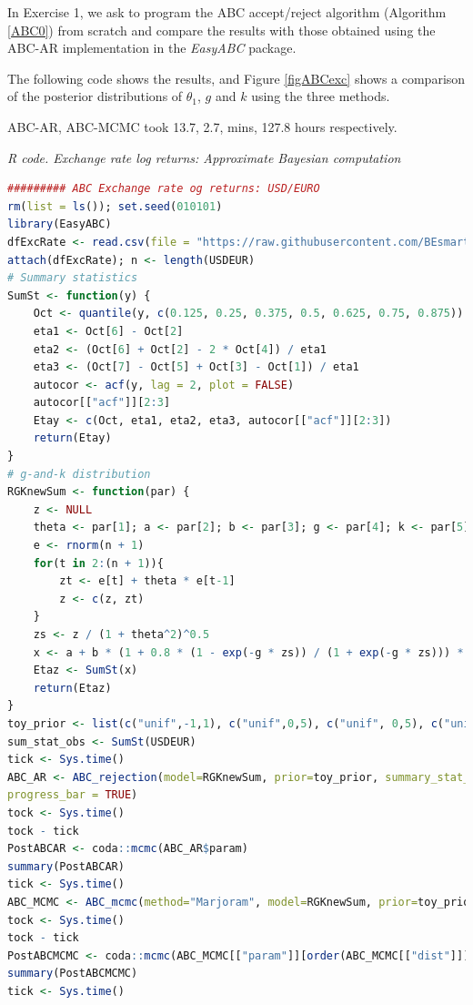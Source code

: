 In Exercise 1, we ask to program the ABC accept/reject algorithm (Algorithm \ref{ABC0}) from scratch and compare the results with those obtained using the ABC-AR implementation in the \textit{EasyABC} package.

The following code shows the results, and Figure \ref{figABCexc} shows a comparison of the posterior distributions of $\theta_1$, $g$ and $k$ using the three methods.

ABC-AR, ABC-MCMC took 13.7, 2.7,  mins, 127.8 hours respectively.

\begin{tcolorbox}[enhanced,width=4.67in,center upper,
	fontupper=\large\bfseries,drop shadow southwest,sharp corners]
	\textit{R code. Exchange rate log returns: Approximate Bayesian computation}
	\begin{VF}
		\begin{lstlisting}[language=R]
######### ABC Exchange rate og returns: USD/EURO
rm(list = ls()); set.seed(010101)
library(EasyABC)
dfExcRate <- read.csv(file = "https://raw.githubusercontent.com/BEsmarter-consultancy/BSTApp/refs/heads/master/DataApp/ExchangeRate.csv", sep = ",", header = T)
attach(dfExcRate); n <- length(USDEUR)
# Summary statistics
SumSt <- function(y) {
	Oct <- quantile(y, c(0.125, 0.25, 0.375, 0.5, 0.625, 0.75, 0.875))
	eta1 <- Oct[6] - Oct[2]
	eta2 <- (Oct[6] + Oct[2] - 2 * Oct[4]) / eta1
	eta3 <- (Oct[7] - Oct[5] + Oct[3] - Oct[1]) / eta1
	autocor <- acf(y, lag = 2, plot = FALSE)
	autocor[["acf"]][2:3]
	Etay <- c(Oct, eta1, eta2, eta3, autocor[["acf"]][2:3])
	return(Etay)
}
# g-and-k distribution
RGKnewSum <- function(par) {
	z <- NULL
	theta <- par[1]; a <- par[2]; b <- par[3]; g <- par[4]; k <- par[5]
	e <- rnorm(n + 1)
	for(t in 2:(n + 1)){
		zt <- e[t] + theta * e[t-1]
		z <- c(z, zt)
	}
	zs <- z / (1 + theta^2)^0.5
	x <- a + b * (1 + 0.8 * (1 - exp(-g * zs)) / (1 + exp(-g * zs))) * (1 + zs^2)^k * zs
	Etaz <- SumSt(x)
	return(Etaz)
}
toy_prior <- list(c("unif",-1,1), c("unif",0,5), c("unif", 0,5), c("unif", -5,5), c("unif", -0.5,5))
sum_stat_obs <- SumSt(USDEUR)
tick <- Sys.time()
ABC_AR <- ABC_rejection(model=RGKnewSum, prior=toy_prior, summary_stat_target = sum_stat_obs, nb_simul=100000, tol = 0.01,
progress_bar = TRUE)
tock <- Sys.time()
tock - tick
PostABCAR <- coda::mcmc(ABC_AR$param)
summary(PostABCAR)
tick <- Sys.time()
ABC_MCMC <- ABC_mcmc(method="Marjoram", model=RGKnewSum, prior=toy_prior, summary_stat_target=sum_stat_obs, n_rec = 10000, progress_bar = TRUE)
tock <- Sys.time()
tock - tick
PostABCMCMC <- coda::mcmc(ABC_MCMC[["param"]][order(ABC_MCMC[["dist"]])[1:1000],])
summary(PostABCMCMC)
tick <- Sys.time()
\end{lstlisting}
	\end{VF}
\end{tcolorbox}

